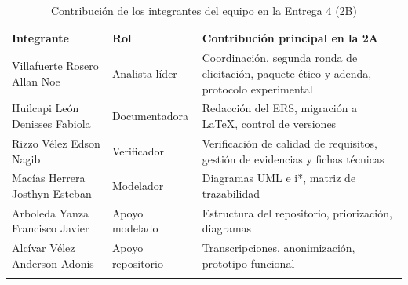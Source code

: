 \begin{longtable}{|L{4.4cm}|L{4.0cm}|L{6.8cm}|}
\hline
{}\textbf{Integrante} & \textbf{Rol} & \textbf{Contribución principal en la 2A} \\
\hline
\endhead
Villafuerte Rosero Allan Noe & Analista líder & Coordinación, segunda ronda de elicitación, paquete ético y adenda, protocolo experimental \\ \hline
Huilcapi León Denisses Fabiola & Documentadora & Redacción del ERS, migración a \LaTeX, control de versiones \\ \hline
Rizzo Vélez Edson Nagib & Verificador & Verificación de calidad de requisitos, gestión de evidencias y fichas técnicas \\ \hline
Macías Herrera Josthyn Esteban & Modelador & Diagramas UML e i*, matriz de trazabilidad \\ \hline
Arboleda Yanza Francisco Javier & Apoyo modelado & Estructura del repositorio, priorización, diagramas \\ \hline
Alcívar Vélez Anderson Adonis & Apoyo repositorio & Transcripciones, anonimización, prototipo funcional \\ \hline
\caption{Contribución de los integrantes del equipo en la Entrega 4 (2B)}
\end{longtable}



